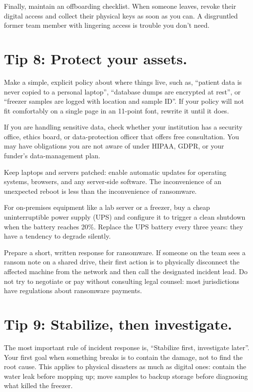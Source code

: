 \documentclass[10pt,letterpaper]{article}
\begin{document}
Finally, maintain an offboarding checklist. When someone leaves, revoke their
digital access and collect their physical keys as soon as you can. A disgruntled
former team member with lingering access is trouble you don't need.

\section*{Tip 8: Protect your assets.}

Make a simple, explicit policy about where things live, such as, ``patient data
is never copied to a personal laptop'', ``database dumps are encrypted at rest'',
or ``freezer samples are logged with location and sample ID''.  If your policy
will not fit comfortably on a single page in an 11-point font, rewrite it until
it does.

\begin{notebox}

If you are handling sensitive data, check whether your institution has a
security office, ethics board, or data-protection officer that offers free
consultation. You may have obligations you are not aware of under HIPAA, GDPR,
or your funder's data-management plan.

\end{notebox}

Keep laptops and servers patched: enable automatic updates for operating
systems, browsers, and any server-side software. The inconvenience of an
unexpected reboot is less than the inconvenience of ransomware.

For on-premises equipment like a lab server or a freezer, buy a cheap
uninterruptible power supply (UPS) and configure it to trigger a clean shutdown
when the battery reaches 20\%.  Replace the UPS battery every three years: they
have a tendency to degrade silently.

Prepare a short, written response for ransomware. If someone on the team sees a
ransom note on a shared drive, their first action is to physically disconnect
the affected machine from the network and then call the designated incident
lead. Do not try to negotiate or pay without consulting legal counsel: most
jurisdictions have regulations about ransomware payments.

\section*{Tip 9: Stabilize, then investigate.}

The most important rule of incident response is, ``Stabilize first, investigate
later''. Your first goal when something breaks is to contain the damage, not to
find the root cause. This applies to physical disasters as much as digital ones:
contain the water leak before mopping up; move samples to backup storage before
diagnosing what killed the freezer.
\end{document}
